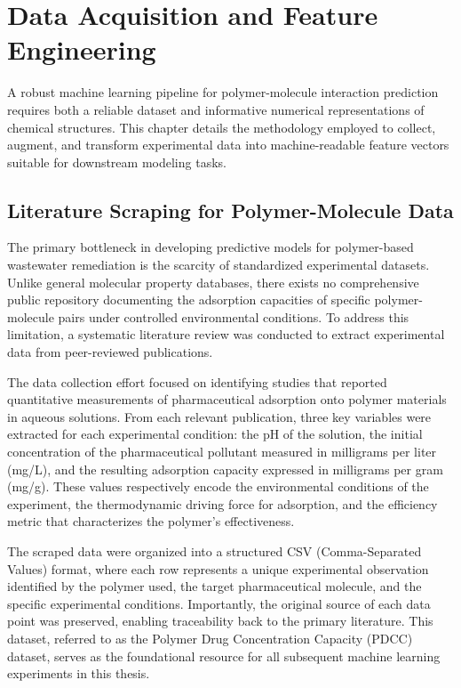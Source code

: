 \chapter{Data Acquisition and Feature Engineering}

A robust machine learning pipeline for polymer-molecule interaction prediction requires both a reliable dataset and informative numerical representations of chemical structures. This chapter details the methodology employed to collect, augment, and transform experimental data into machine-readable feature vectors suitable for downstream modeling tasks.

\section{Literature Scraping for Polymer-Molecule Data}
\label{sec:literature_scraping}

The primary bottleneck in developing predictive models for polymer-based wastewater remediation is the scarcity of standardized experimental datasets. Unlike general molecular property databases, there exists no comprehensive public repository documenting the adsorption capacities of specific polymer-molecule pairs under controlled environmental conditions. To address this limitation, a systematic literature review was conducted to extract experimental data from peer-reviewed publications.

The data collection effort focused on identifying studies that reported quantitative measurements of pharmaceutical adsorption onto polymer materials in aqueous solutions. From each relevant publication, three key variables were extracted for each experimental condition: the pH of the solution, the initial concentration of the pharmaceutical pollutant measured in milligrams per liter (mg/L), and the resulting adsorption capacity expressed in milligrams per gram (mg/g). These values respectively encode the environmental conditions of the experiment, the thermodynamic driving force for adsorption, and the efficiency metric that characterizes the polymer's effectiveness.

The scraped data were organized into a structured CSV (Comma-Separated Values) format, where each row represents a unique experimental observation identified by the polymer used, the target pharmaceutical molecule, and the specific experimental conditions. Importantly, the original source of each data point was preserved, enabling traceability back to the primary literature. This dataset, referred to as the Polymer Drug Concentration Capacity (PDCC) dataset, serves as the foundational resource for all subsequent machine learning experiments in this thesis.

